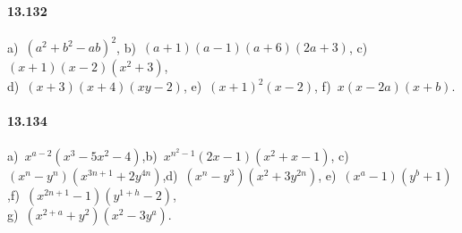 \paragraph{13.132}
a)~$\left(a^{2}+b^{2}-ab\right)^{2}$,\quad
b)~$(a+1)(a-1)(a+6)(2a+3)$,\quad
c)~$(x+1)(x-2)\left(x^{2}+3\right)$,\protect\\
d)~$(x+3)(x+4)(xy-2)$,\quad 
e)~$(x+1)^{2}(x-2)$,\quad
f)~$x(x-2a)(x+b)$.

\paragraph{13.134} a)~$x^{a-2}(x^{3}-5x^{2}-4)$,\quad b)~$x^{n^{2}-1}(2x-1)(x^{2}+x-1)$,\quad
c)~$(x^{n}-y^{n})(x^{3n+1}+2y^{4n})$,\quad d)~$(x^{n}-y^{3})(x^{2}+3y^{2n})$,\quad
e)~$(x^{a}-1)(y^{b}+1)$,\quad f)~$(x^{2n+1}-1)(y^{1+h}-2)$,\protect\\
g)~$(x^{2+a}+y^{2})(x^{2}-3y^{a})$.


